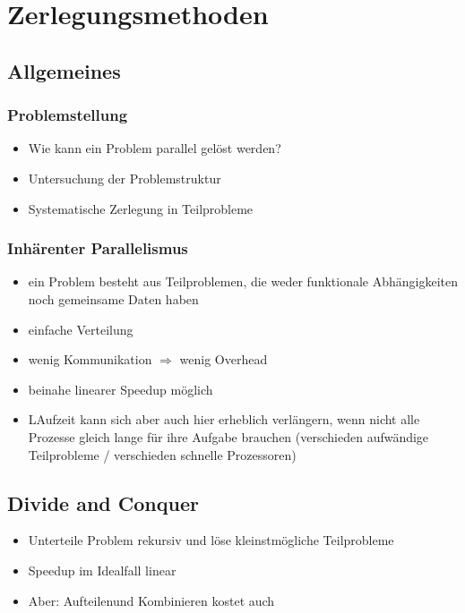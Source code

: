 \documentclass[a4paper, 12pt]{article}
\begin{document}
\section{Zerlegungsmethoden}


\subsection{Allgemeines}

\subsubsection*{Problemstellung}
\begin{itemize}
  \item Wie kann ein Problem parallel gelöst werden?
  \item Untersuchung der Problemstruktur
  \item Systematische Zerlegung in Teilprobleme
\end{itemize}

\subsubsection*{Inhärenter Parallelismus}
\begin{itemize}
  \item ein Problem besteht aus Teilproblemen, die weder funktionale Abhängigkeiten noch gemeinsame Daten haben
  \item einfache Verteilung
  \item wenig Kommunikation \(\Rightarrow\) wenig Overhead
  \item beinahe linearer Speedup möglich
  \item LAufzeit kann sich aber auch hier erheblich verlängern, wenn nicht alle Prozesse gleich lange für ihre Aufgabe brauchen (verschieden aufwändige Teilprobleme / verschieden schnelle Prozessoren)
\end{itemize}


\subsection{Divide and Conquer}
\begin{itemize}
  \item Unterteile Problem rekursiv und löse kleinstmögliche Teilprobleme
  \item Speedup im Idealfall linear
  \item Aber: Aufteilenund Kombinieren kostet auch
\end{itemize}
\end{document}
